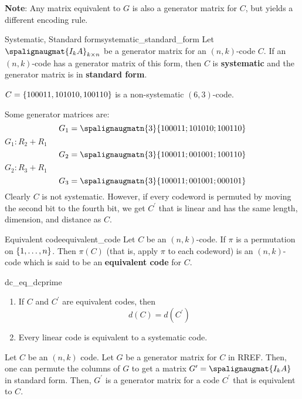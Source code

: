 \textbf{Note}: Any matrix equivalent to $ G $ is also a generator matrix
for $ C $, but yields a different encoding rule.

\begin{Definition}{Systematic, Standard form}{systematic_standard_form}
    Let $ \spalignaugmat{I_k A}_{k\times n} $ be a generator matrix
    for an $ (n,k) $-code $ C $. If an $ (n,k) $-code has a generator
    matrix of this form, then $ C $ is \textbf{systematic} and the generator
    matrix is in \textbf{standard form}.
\end{Definition}

\begin{Example}{}{}
    $ C=\{100011,101010,100110\} $
    is a non-systematic $ (6,3) $-code.

    Some generator matrices are:
    \[ G_1=\spalignaugmatn{3}{
            1 0 0 0 1 1 ;
            1 0 1 0 1 0 ;
            1 0 0 1 1 0} \]
    $ G_1: R_2+R_1 $
    \[ G_2=\spalignaugmatn{3}{
            1 0 0 0 1 1 ;
            0 0 1 0 0 1 ;
            1 0 0 1 1 0} \]
    $ G_2: R_3+R_1 $
    \[ G_3=\spalignaugmatn{3}{
            1 0 0 0 1 1 ;
            0 0 1 0 0 1 ;
            0 0 0 1 0 1} \]
    Clearly $ C $ is not systematic. However, if every codeword
    is permuted by moving the second bit to the fourth bit, we get $ C^{\prime} $
    that is linear and has the same length, dimension, and distance as $ C $.
\end{Example}

\begin{Definition}{Equivalent code}{equivalent_code}
    Let $ C $ be an $ (n,k) $-code. If $ \pi $ is a permutation on
    $ \{1,\ldots ,n\} $. Then $ \pi(C) $ (that is, apply $ \pi $ to each
    codeword) is an $ (n,k) $-code which is said to be an \textbf{equivalent code}
    for $ C $.
\end{Definition}

\begin{Theorem}{}{dc_eq_dcprime}
    \begin{enumerate}[label=(\arabic*)]
        \item If $ C $ and $ C^{\prime} $ are equivalent codes, then
              \[ d(C)=d(C^{\prime}) \]
        \item Every linear code is equivalent to a systematic code.
    \end{enumerate}
\end{Theorem}

\begin{Proof}{}{}
    Let $ C $ be an $ (n,k) $ code. Let $ G $ be a generator matrix for $ C $
    in RREF\@. Then, one can permute the columns of $ G $ to get a matrix
    $ G^{\prime}=\spalignaugmat{I_k A} $ in standard form. Then,
    $ G^{\prime} $ is a generator matrix for a code $ C^{\prime} $ that is
    equivalent to $ C $.
\end{Proof}

